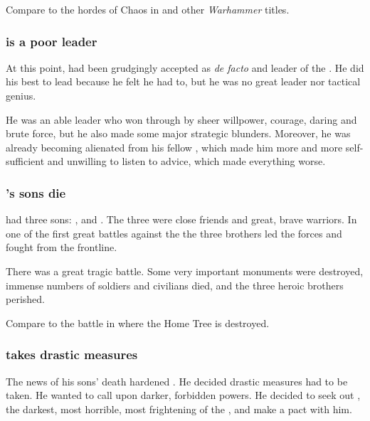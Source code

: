 Compare to the hordes of Chaos in \cite{RPG:Warhammer:HighElves} and other \emph{Warhammer} titles. 




\subsubsection{\Ishnaruchaefir is a poor leader}
At this point, \Ishnaruchaefir{} had been grudgingly accepted as \emph{de facto} \dragonlord{} and leader of the \dragons.
He did his best to lead because he felt he had to, but he was no great leader nor tactical genius. 

He was an able leader who won through by sheer willpower, courage, daring and brute force, but he also made some major strategic blunders. 
Moreover, he was already becoming alienated from his fellow \dragons{}, which made him more and more self-sufficient and unwilling to listen to advice, which made everything worse. 





\subsubsection{\Ishnaruchaefir's sons die}
\Ishnaruchaefir had three sons:
,  and . 
The three were close friends and great, brave warriors. 
In one of the first great battles against the \resphain the three brothers led the \draconian forces and fought from the frontline.

There was a great tragic battle.
Some very important monuments were destroyed, immense numbers of soldiers and civilians died, and the three heroic brothers perished. 

Compare to the battle in \cite{Movie:Avatar} where the Home Tree is destroyed. 





\subsubsection{\Ishnaruchaefir takes drastic measures}
The news of his sons' death hardened \Ishnaruchaefir. 
He decided drastic measures had to be taken. 
He wanted to call upon darker, forbidden powers. 
He decided to seek out \NerrhanKoss, the darkest, most horrible, most frightening of the \xss, and make a pact with him. 

